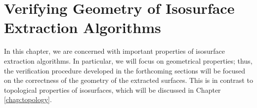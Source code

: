 \chapter{Verifying Geometry of Isosurface Extraction Algorithms}
\label{chap:geometry}

In this chapter, we are concerned with important properties of isosurface extraction algorithms. 
In particular, we will focus on geometrical properties; thus, the verification
procedure developed in the forthcoming sections will be focused on the correctness of the geometry of the extracted surfaces. This is in contrast to topological properties of isosurfaces, which will be discussed in
Chapter \ref{chap:topology}. 


%

%

%

%

%

%
